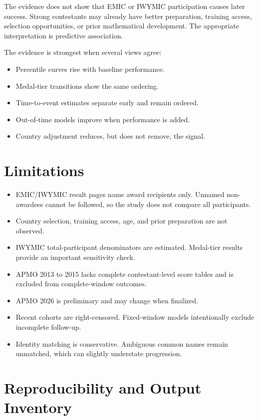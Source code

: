 \documentclass[11pt]{article}
\begin{document}
The evidence does not show that EMIC or IWYMIC participation causes later success. Strong contestants may already have better preparation, training access, selection opportunities, or prior mathematical development. The appropriate interpretation is predictive association.

The evidence is strongest when several views agree:
\begin{itemize}
\item Percentile curves rise with baseline performance.
\item Medal-tier transitions show the same ordering.
\item Time-to-event estimates separate early and remain ordered.
\item Out-of-time models improve when performance is added.
\item Country adjustment reduces, but does not remove, the signal.
\end{itemize}

\section{Limitations}
\begin{itemize}
\item EMIC/IWYMIC result pages name award recipients only. Unnamed non-awardees cannot be followed, so the study does not compare all participants.
\item Country selection, training access, age, and prior preparation are not observed.
\item IWYMIC total-participant denominators are estimated. Medal-tier results provide an important sensitivity check.
\item APMO 2013 to 2015 lacks complete contestant-level score tables and is excluded from complete-window outcomes.
\item APMO 2026 is preliminary and may change when finalized.
\item Recent cohorts are right-censored. Fixed-window models intentionally exclude incomplete follow-up.
\item Identity matching is conservative. Ambiguous common names remain unmatched, which can slightly understate progression.
\end{itemize}

\section{Reproducibility and Output Inventory}
\end{document}
